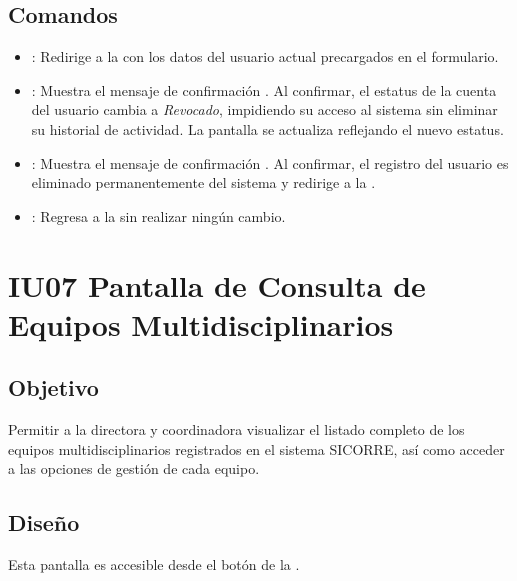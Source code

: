 \subsection{Comandos}
\begin{itemize}
	\item {}: Redirige a la 
	 con los 
	datos del usuario actual precargados en el formulario.
	
	\item {}: Muestra el mensaje de confirmación 
	. Al confirmar, 
	el estatus de la cuenta del usuario cambia a \textit{Revocado}, 
	impidiendo su acceso al sistema sin eliminar su historial de 
	actividad. La pantalla se actualiza reflejando el nuevo estatus.
	
	\item {}: Muestra el mensaje de confirmación 
	. Al confirmar, 
	el registro del usuario es eliminado permanentemente del sistema 
	y redirige a la 
	.
	
	\item {}: Regresa a la 
	 sin realizar 
	ningún cambio.
\end{itemize}


\section{IU07 Pantalla de Consulta de Equipos Multidisciplinarios}

\subsection{Objetivo}
Permitir a la directora y coordinadora visualizar el listado completo 
de los equipos multidisciplinarios registrados en el sistema SICORRE, 
así como acceder a las opciones de gestión de cada equipo.

\subsection{Diseño}
Esta pantalla  es accesible desde el botón 
 de la 
.

